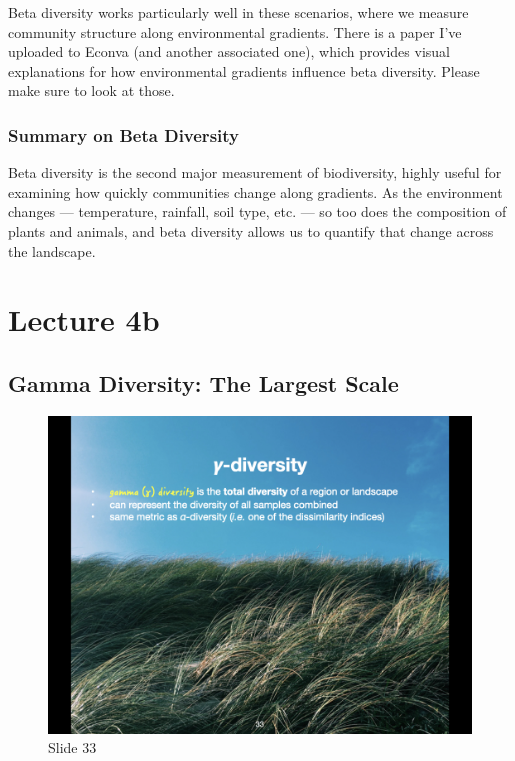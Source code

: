 \documentclass[
  11pt,
]{book}
\begin{document}
Beta diversity works particularly well in these scenarios, where we
measure community structure along environmental gradients. There is a
paper I've uploaded to Econva (and another associated one), which
provides visual explanations for how environmental gradients influence
beta diversity. Please make sure to look at those.

\subsection{Summary on Beta Diversity}\label{summary-on-beta-diversity}

Beta diversity is the second major measurement of biodiversity, highly
useful for examining how quickly communities change along gradients. As
the environment changes --- temperature, rainfall, soil type, etc. ---
so too does the composition of plants and animals, and beta diversity
allows us to quantify that change across the landscape.

\chapter*{Lecture 4b}\label{lecture-4b}

\section{Gamma Diversity: The Largest
Scale}\label{gamma-diversity-the-largest-scale}

\begin{figure}[ht]
\centering
\includegraphics[width=0.8\linewidth]{../images/BDC334/BDC334-033.jpeg}
\caption*{Slide 33}
\end{figure}
\end{document}
